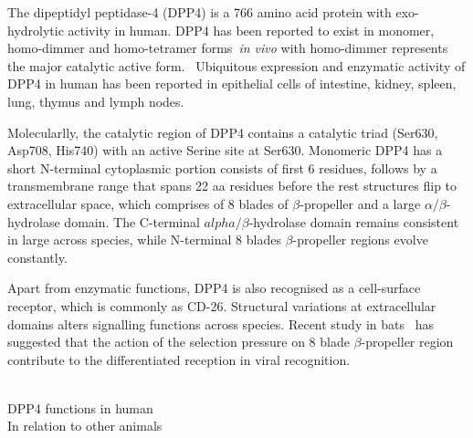 The dipeptidyl peptidase-4 (DPP4) is a 766 amino acid protein with exo-hydrolytic activity in human. DPP4 has been reported to exist in  monomer, homo-dimmer and homo-tetramer forms~\textit{in vivo} with homo-dimmer represents the major catalytic active form.~\cite{Mulvihill_2014} Ubiquitous expression and enzymatic activity of DPP4 in human has been reported in epithelial cells of intestine, kidney, spleen, lung, thymus and lymph nodes. 

Molecularlly, the catalytic region of DPP4 contains a catalytic triad (Ser630, Asp708, His740) with an active Serine site at Ser630. Monomeric DPP4 has a short N-terminal cytoplasmic portion consists of first 6 residues, follows by a transmembrane range that spans 22 aa residues before the rest structures flip to extracellular space, which comprises of 8 blades of $\beta$-propeller and a large $\alpha/\beta$-hydrolase domain. The C-terminal $alpha/\beta$-hydrolase domain remains consistent in large across species, while N-terminal 8 blades $\beta$-propeller regions evolve constantly. 

Apart from enzymatic functions, DPP4 is also recognised as a cell-surface receptor, which is commonly as CD-26. Structural variations at extracellular domains alters signalling functions across species. Recent study in bats~\cite{Letko_2018, Cui_2013} has suggested that the action of the selection pressure on 8 blade $\beta$-propeller region contribute to the differentiated reception in viral recognition.  

\\
DPP4 functions in human 
\\ 
In relation to other animals 


